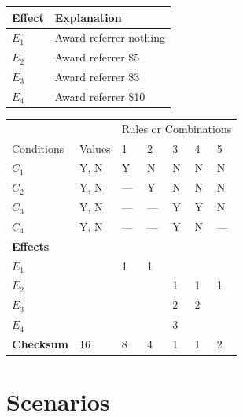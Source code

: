 \documentclass[10pt,letterpaper]{article}
\begin{document}
\begin{table}[h]
\begin{tabular}{@{}ll@{}}
\toprule
Effect & Explanation            \\ \midrule
$E_1$  & Award referrer nothing \\ \midrule
$E_2$  & Award referrer \$5     \\ \midrule
$E_3$  & Award referrer \$3     \\ \midrule
$E_4$  & Award referrer \$10    \\ \bottomrule
\end{tabular}
\end{table}

\begin{table}[h]
\begin{tabular}{@{}lllllll@{}}
\toprule
                  &        & \multicolumn{5}{c}{Rules or Combinations} \\ \cmidrule(l){3-7} 
Conditions        & Values & 1      & 2      & 3      & 4      & 5     \\ \midrule
$C_1$             & Y, N   & Y      & N      & N      & N      & N     \\
$C_2$             & Y, N   & —      & Y      & N      & N      & N     \\
$C_3$             & Y, N   & —      & —      & Y      & Y      & N     \\
$C_4$             & Y, N   & —      & —      & Y      & N      & —     \\
\textbf{Effects}  &        &        &        &        &        &       \\
$E_1$             &        & 1      & 1      &        &        &       \\
$E_2$             &        &        &        & 1      & 1      & 1     \\
$E_3$             &        &        &        & 2      & 2      &       \\
$E_4$             &        &        &        & 3      &        &       \\ \midrule
\textbf{Checksum} & 16     & 8      & 4      & 1      & 1      & 2     \\ \bottomrule
\end{tabular}
\end{table}

\newpage
\section{Scenarios}
\end{document}
